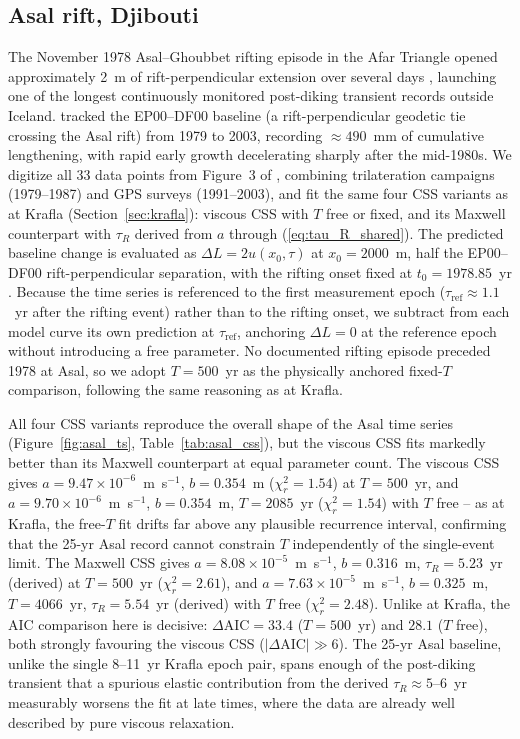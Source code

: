 \documentclass[extra]{gji}
\begin{document}
\subsection{Asal rift, Djibouti}
\label{sec:asal}

The November 1978 Asal--Ghoubbet rifting episode in the Afar Triangle opened
approximately 2~m of rift-perpendicular extension over several days \citep{ledain1979seismotectonic,ruegg1984seismotectonic}, launching one of the longest continuously
monitored post-diking transient records outside Iceland.  \citet{vigny2007twenty}
tracked the EP00--DF00 baseline (a rift-perpendicular geodetic tie crossing
the Asal rift) from 1979 to 2003, recording $\approx490$~mm of cumulative
lengthening, with rapid early growth decelerating sharply after the mid-1980s.
We digitize all 33 data points from Figure~3 of \citet{vigny2007twenty}, combining
trilateration campaigns (1979--1987) and GPS surveys (1991--2003), and fit the
same four CSS variants as at Krafla (Section~\ref{sec:krafla}): viscous CSS
with $T$ free or fixed, and its Maxwell counterpart with $\tau_R$ derived from
$a$ through (\ref{eq:tau_R_shared}).  The
predicted baseline change is evaluated as $\Delta L = 2u(x_0,\tau)$ at
$x_0 = 2000$~m, half the EP00--DF00 rift-perpendicular separation, with the
rifting onset fixed at $t_0 = 1978.85$~yr \citep{vigny2007twenty}.  Because the
\citeauthor{vigny2007twenty} time series is referenced to the first measurement epoch
($\tau_{\mathrm{ref}} \approx 1.1$~yr after the rifting event) rather than to the
rifting onset, we subtract from each model curve its own prediction at
$\tau_{\mathrm{ref}}$, anchoring $\Delta L = 0$ at the reference epoch without
introducing a free parameter.  No documented rifting episode preceded 1978 at
Asal, so we adopt $T = 500$~yr as the physically anchored fixed-$T$ comparison,
following the same reasoning as at Krafla.

All four CSS variants reproduce the overall shape of the Asal time series
(Figure~\ref{fig:asal_ts}, Table~\ref{tab:asal_css}), but the viscous CSS fits
markedly better than its Maxwell counterpart at equal parameter count.  The
viscous CSS gives $a = 9.47\times10^{-6}$~m~s$^{-1}$, $b = 0.354$~m
($\chi^2_r = 1.54$) at $T = 500$~yr, and $a = 9.70\times10^{-6}$~m~s$^{-1}$,
$b = 0.354$~m, $T = 2085$~yr ($\chi^2_r = 1.54$) with $T$ free -- as at
Krafla, the free-$T$ fit drifts far above any plausible recurrence interval,
confirming that the 25-yr Asal record cannot constrain $T$ independently
of the single-event limit.  The Maxwell CSS gives $a = 8.08\times10^{-5}$~m~s$^{-1}$,
$b = 0.316$~m, $\tau_R = 5.23$~yr (derived) at $T = 500$~yr
($\chi^2_r = 2.61$), and $a = 7.63\times10^{-5}$~m~s$^{-1}$, $b = 0.325$~m,
$T = 4066$~yr, $\tau_R = 5.54$~yr (derived) with $T$ free
($\chi^2_r = 2.48$).  Unlike at Krafla, the AIC comparison here is decisive:
$\Delta\mathrm{AIC} = 33.4$ ($T = 500$~yr) and $28.1$ ($T$ free), both
strongly favouring the viscous CSS ($|\Delta\mathrm{AIC}| \gg 6$).  The
25-yr Asal baseline, unlike the single 8--11~yr Krafla epoch pair, spans
enough of the post-diking transient that a spurious elastic contribution
from the derived $\tau_R \approx 5$--$6$~yr measurably worsens the fit at
late times, where the data are already well described by pure viscous
relaxation.
\end{document}
